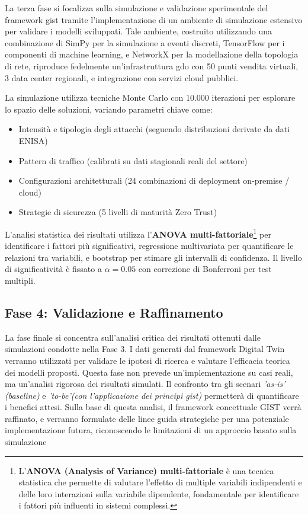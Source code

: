 \label{ssec:fase3}
La terza fase si focalizza sulla simulazione e validazione sperimentale del framework \gls{gist} tramite l'implementazione di un ambiente di simulazione estensivo per validare i modelli sviluppati. Tale ambiente, costruito utilizzando una combinazione di SimPy per la simulazione a eventi discreti, TensorFlow per i componenti di machine learning, e NetworkX per la modellazione della topologia di rete, riproduce fedelmente un'infrastruttura \gls{gdo} con 50 punti vendita virtuali, 3 data center regionali, e integrazione con servizi cloud pubblici.

La simulazione utilizza tecniche Monte Carlo con 10.000 iterazioni per esplorare lo spazio delle soluzioni, variando parametri chiave come:
\begin{itemize}
    \item Intensità e tipologia degli attacchi (seguendo distribuzioni derivate da dati ENISA)
    \item Pattern di traffico (calibrati su dati stagionali reali del settore)
    \item Configurazioni architetturali (24 combinazioni di deployment on-premise / cloud)
    \item Strategie di sicurezza (5 livelli di maturità Zero Trust)
\end{itemize}
L'analisi statistica dei risultati utilizza l'\textbf{ANOVA multi-fattoriale}\footnote{L'\textbf{ANOVA (Analysis of Variance) multi-fattoriale} è una tecnica statistica che permette di valutare l'effetto di multiple variabili indipendenti e delle loro interazioni sulla variabile dipendente, fondamentale per identificare i fattori più influenti in sistemi complessi.} per identificare i fattori più significativi, regressione multivariata per quantificare le relazioni tra variabili, e bootstrap per stimare gli intervalli di confidenza. Il livello di significatività è fissato a $\alpha = 0.05$ con correzione di Bonferroni per test multipli.

\subsection{\texorpdfstring{\textbf{Fase 4: Validazione e Raffinamento}}{1.5.5 - Fase 4: Validazione e Raffinamento}}

\label{ssec:fase4}
La fase finale si concentra sull'analisi critica dei risultati ottenuti dalle simulazioni condotte nella Fase 3. I dati generati dal framework Digital Twin verranno utilizzati per validare le ipotesi di ricerca e valutare l'efficacia teorica dei modelli proposti. Questa fase non prevede un'implementazione su casi reali, ma un'analisi rigorosa dei risultati simulati. Il confronto tra gli scenari \emph{'as-is' (baseline)} e \emph{'to-be'(con l'applicazione dei principi \gls{gist})} permetterà di quantificare i benefici attesi. Sulla base di questa analisi, il framework concettuale GIST verrà raffinato, e verranno formulate delle linee guida strategiche per una potenziale implementazione futura, riconoscendo le limitazioni di un approccio basato sulla simulazione

